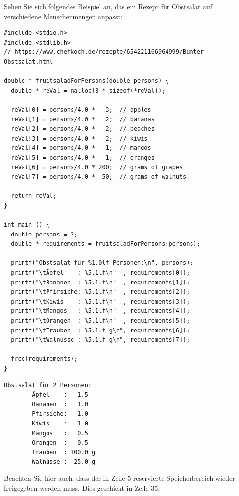Sehen Sie sich folgendes Beispiel an, das ein Rezept für Obstsalat auf verschiedene Menschenmengen anpasst:

\begin{codebox}
\begin{verbatim}
#include <stdio.h>
#include <stdlib.h>
// https://www.chefkoch.de/rezepte/654221166964999/Bunter-Obstsalat.html

double * fruitsaladForPersons(double persons) {
  double * reVal = malloc(8 * sizeof(*reVal));
  
  reVal[0] = persons/4.0 *   3;  // apples
  reVal[1] = persons/4.0 *   2;  // bananas
  reVal[2] = persons/4.0 *   2;  // peaches
  reVal[3] = persons/4.0 *   2;  // kiwis
  reVal[4] = persons/4.0 *   1;  // mangos
  reVal[5] = persons/4.0 *   1;  // oranges
  reVal[6] = persons/4.0 * 200;  // grams of grapes
  reVal[7] = persons/4.0 *  50;  // grams of walnuts
  
  return reVal;
}

int main () {
  double persons = 2;
  double * requirements = fruitsaladForPersons(persons);
  
  printf("Obstsalat für %1.0lf Personen:\n", persons);
  printf("\tÄpfel    : %5.1lf\n"  , requirements[0]);
  printf("\tBananen  : %5.1lf\n"  , requirements[1]);
  printf("\tPfirsiche: %5.1lf\n"  , requirements[2]);
  printf("\tKiwis    : %5.1lf\n"  , requirements[3]);
  printf("\tMangos   : %5.1lf\n"  , requirements[4]);
  printf("\tOrangen  : %5.1lf\n"  , requirements[5]);
  printf("\tTrauben  : %5.1lf g\n", requirements[6]);
  printf("\tWalnüsse : %5.1lf g\n", requirements[7]);
  
  free(requirements);
}
\end{verbatim}
\end{codebox}

\begin{cmdbox}
\begin{verbatim}
Obstsalat für 2 Personen:
        Äpfel    :   1.5
        Bananen  :   1.0
        Pfirsiche:   1.0
        Kiwis    :   1.0
        Mangos   :   0.5
        Orangen  :   0.5
        Trauben  : 100.0 g
        Walnüsse :  25.0 g
\end{verbatim}
\end{cmdbox}

Beachten Sie hier auch, dass der in Zeile 5 reservierte Speicherbereich wieder freigegeben werden muss. Dies geschieht in Zeile 35.


